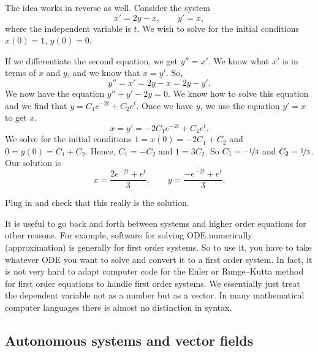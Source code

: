 \begin{example}
The idea works in reverse as well.  Consider 
the system
\begin{equation*}
x' = 2y-x , \qquad
y' = x, 
\end{equation*}
where the independent variable is $t$.  We wish to solve for the initial
conditions $x(0) = 1$, $y(0) =0$.

If we differentiate the second equation, we get
$y''=x'$.  We know what $x'$ is in terms of $x$ and $y$, and
we know that $x=y'$.  So,
\begin{equation*}
y'' = x' = 2y-x = 2y-y' .
\end{equation*}
We now have the equation $y''+y'-2y = 0$.  We know how to solve this
equation and we find that $y = C_1 e^{-2t} + C_2 e^t$.  Once we have $y$,
we use the equation $y' = x$ to get $x$.
\begin{equation*}
x = y' = -2 C_1 e^{-2t} + C_2 e^t .
\end{equation*}
We solve for the initial conditions $1 = x(0) = -2 C_1 + C_2$
and $0 = y(0) = C_1 + C_2$.  Hence, $C_1 = -C_2$ and $1 = 3C_2$.
So $C_1 = \nicefrac{-1}{3}$ and $C_2 = \nicefrac{1}{3}$.  Our solution is
\begin{equation*}
x = \frac{2e^{-2t} + e^t}{3} ,\qquad
y = \frac{-e^{-2t} + e^t}{3} .
\end{equation*}
\end{example}

\begin{exercise}
Plug in and check that this really is the solution.
\end{exercise}

It is useful to go back and forth between systems and higher order equations
for other reasons.  For example, software for solving ODE numerically
(approximation) is generally for first order systems.  So to use it,
you have to take whatever ODE you want to solve and convert it to a first
order system.  In fact, it is not very hard
to adapt computer code for the Euler or Runge--Kutta method for first order equations to
handle first
order systems.  We essentially just treat the dependent variable not as
a number but as a vector.  In many mathematical computer languages there is
almost no distinction in syntax.


\subsection{Autonomous systems and vector fields}

